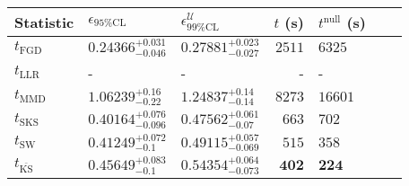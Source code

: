 \begin{tabular}{l|llr|llr}
	Statistic & $\epsilon_{95\%\mathrm{CL}}$ & $\epsilon^    {\mathcal{U}}_{99\%\mathrm{CL}}$ & $t$ (s) & $t^{\mathrm{null}}$ (s) \\
	\midrule
	$t_{\mathrm{FGD}}$ & ${\mathbf{0.24366_{-0.046}^{+0.031}}}$ & ${\mathbf{0.27881_{-0.027}^{+0.023}}}$ & $2511$ & $6325$ \\
	$t_{\mathrm{LLR}}$ & - & - & - & - \\
	$t_{\mathrm{MMD}}$ & $1.06239_{-0.22}^{+0.16}$ & $1.24837_{-0.14}^{+0.14}$ & $8273$ & $16601$ \\
	$t_{\mathrm{SKS}}$ & $0.40164_{-0.096}^{+0.076}$ & $0.47562_{-0.07}^{+0.061}$ & $663$ & $702$ \\
	$t_{\mathrm{SW}}$ & $0.41249_{-0.1}^{+0.072}$ & $0.49115_{-0.069}^{+0.057}$ & $515$ & $358$ \\
	$t_{\overline{\mathrm{KS}}}$ & $0.45649_{-0.1}^{+0.083}$ & $0.54354_{-0.073}^{+0.064}$ & ${\mathbf{402}}$ & ${\mathbf{224}}$ \\
	\bottomrule
\end{tabular}